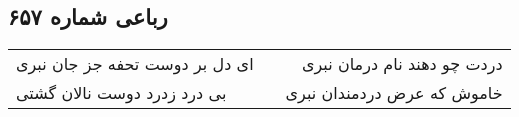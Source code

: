 \begin{center}
\section*{رباعی شماره ۶۵۷}
\label{sec:sh657}
\begin{longtable}{l p{0.5cm} r}
ای دل بر دوست تحفه جز جان نبری
&&
دردت چو دهند نام درمان نبری
\\
بی درد زدرد دوست نالان گشتی
&&
خاموش که عرض دردمندان نبری
\\
\end{longtable}
\end{center}
